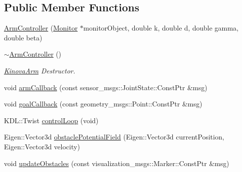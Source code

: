 \subsection*{Public Member Functions}
\begin{DoxyCompactItemize}
\item 
\hyperlink{class_arm_controller_a27a8d755210b8e3bd96217ea8080b327}{Arm\+Controller} (\hyperlink{class_monitor}{Monitor} $\ast$monitor\+Object, double k, double d, double gamma, double beta)
\item 
\hyperlink{class_arm_controller_ad2b44ab21366148d89980e942b26d232}{$\sim$\+Arm\+Controller} ()\hypertarget{class_arm_controller_ad2b44ab21366148d89980e942b26d232}{}\label{class_arm_controller_ad2b44ab21366148d89980e942b26d232}

\begin{DoxyCompactList}\small\item\em \hyperlink{class_kinova_arm}{Kinova\+Arm} Destructor. \end{DoxyCompactList}\item 
void \hyperlink{class_arm_controller_a29defeb3894d62016523a99b63320a22}{arm\+Callback} (const sensor\+\_\+msgs\+::\+Joint\+State\+::\+Const\+Ptr \&msg)
\item 
void \hyperlink{class_arm_controller_acbd85ddee96c8d6fd76728c68fb12d3c}{goal\+Callback} (const geometry\+\_\+msgs\+::\+Point\+::\+Const\+Ptr \&msg)
\item 
K\+D\+L\+::\+Twist \hyperlink{class_arm_controller_ad7e00a70c968a23087415b1bd0ac8bf1}{control\+Loop} (void)
\item 
Eigen\+::\+Vector3d \hyperlink{class_arm_controller_ad0b1f28333e2a3be76258153a745803d}{obstacle\+Potential\+Field} (Eigen\+::\+Vector3d current\+Position, Eigen\+::\+Vector3d velocity)
\item 
void \hyperlink{class_arm_controller_a17d05bd19286dc4e04355e3d4f6bb372}{update\+Obstacles} (const visualization\+\_\+msgs\+::\+Marker\+::\+Const\+Ptr \&msg)
\end{DoxyCompactItemize}
